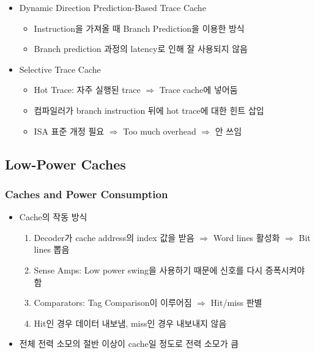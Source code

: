 \begin{itemize}
\begin{itemize}
    \end{itemize}
    \item Dynamic Direction Prediction-Based Trace Cache
    \begin{itemize}
        \item Instruction을 가져올 때 Branch Prediction을 이용한 방식
        \item Branch prediction 과정의 latency로 인해 잘 사용되지 않음
    \end{itemize}
    \item Selective Trace Cache
    \begin{itemize}
        \item Hot Trace: 자주 실행된 trace $\Rightarrow$ Trace cache에 넣어둠
        \item 컴파일러가 branch instruction 뒤에 hot trace에 대한 힌트 삽입
        \item ISA 표준 개정 필요 $\Rightarrow$ Too much overhead $\Rightarrow$ 안 쓰임
    \end{itemize}
\end{itemize}

\subsection{Low-Power Caches}

\subsubsection*{Caches and Power Consumption}
\begin{itemize}
    \item Cache의 작동 방식
    \begin{enumerate}
        \item Decoder가 cache address의 index 값을 받음 $\Rightarrow$ Word lines 활성화 $\Rightarrow$ Bit lines 뽑음
        \item Sense Amps: Low power swing을 사용하기 때문에 신호를 다시 증폭시켜야 함
        \item Comparators: Tag Comparison이 이루어짐 $\Rightarrow$ Hit/miss 판별
        \item Hit인 경우 데이터 내보냄, miss인 경우 내보내지 않음
    \end{enumerate}
    \item 전체 전력 소모의 절반 이상이 cache일 정도로 전력 소모가 큼
\end{itemize}

